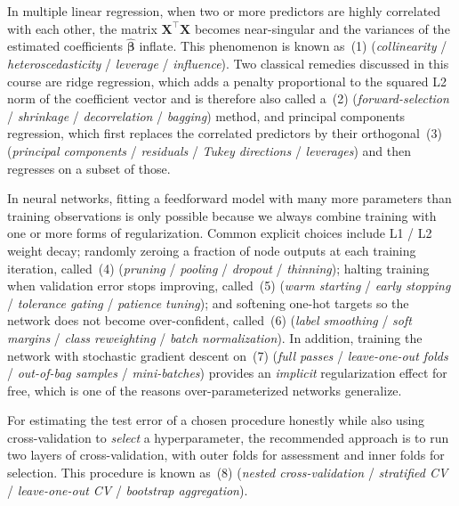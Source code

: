 \documentclass[11pt,a4paper]{article}
\begin{document}
In multiple linear regression, when two or more predictors are highly correlated with each other, the matrix $\mathbf X^\top \mathbf X$ becomes near-singular and the variances of the estimated coefficients $\hat{\boldsymbol\beta}$ inflate. This phenomenon is known as \underline{\hspace{2.5cm}}\,(1) (\emph{collinearity} / \emph{heteroscedasticity} / \emph{leverage} / \emph{influence}). Two classical remedies discussed in this course are ridge regression, which adds a penalty proportional to the squared L2 norm of the coefficient vector and is therefore also called a \underline{\hspace{2.5cm}}\,(2) (\emph{forward-selection} / \emph{shrinkage} / \emph{decorrelation} / \emph{bagging}) method, and principal components regression, which first replaces the correlated predictors by their orthogonal \underline{\hspace{2.5cm}}\,(3) (\emph{principal components} / \emph{residuals} / \emph{Tukey directions} / \emph{leverages}) and then regresses on a subset of those.

In neural networks, fitting a feedforward model with many more parameters than training observations is only possible because we always combine training with one or more forms of regularization. Common explicit choices include L1 / L2 weight decay; randomly zeroing a fraction of node outputs at each training iteration, called \underline{\hspace{2.5cm}}\,(4) (\emph{pruning} / \emph{pooling} / \emph{dropout} / \emph{thinning}); halting training when validation error stops improving, called \underline{\hspace{2.5cm}}\,(5) (\emph{warm starting} / \emph{early stopping} / \emph{tolerance gating} / \emph{patience tuning}); and softening one-hot targets so the network does not become over-confident, called \underline{\hspace{2.5cm}}\,(6) (\emph{label smoothing} / \emph{soft margins} / \emph{class reweighting} / \emph{batch normalization}). In addition, training the network with stochastic gradient descent on \underline{\hspace{2.5cm}}\,(7) (\emph{full passes} / \emph{leave-one-out folds} / \emph{out-of-bag samples} / \emph{mini-batches}) provides an \emph{implicit} regularization effect for free, which is one of the reasons over-parameterized networks generalize.

For estimating the test error of a chosen procedure honestly while also using cross-validation to \emph{select} a hyperparameter, the recommended approach is to run two layers of cross-validation, with outer folds for assessment and inner folds for selection. This procedure is known as \underline{\hspace{2.5cm}}\,(8) (\emph{nested cross-validation} / \emph{stratified CV} / \emph{leave-one-out CV} / \emph{bootstrap aggregation}).
\end{document}

